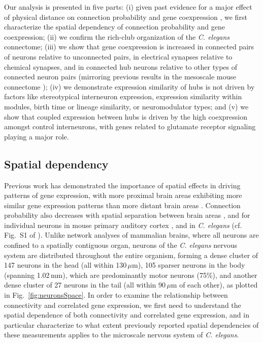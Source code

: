 \documentclass[10pt,letterpaper]{article}
\begin{document}
Our analysis is presented in five parts:
(i) given past evidence for a major effect of physical distance on connection probability and gene coexpression \cite{Fulcher:2016ck}, we first characterize the spatial dependency of connection probability and gene coexpression;
(ii) we confirm the rich-club organization of the \emph{C. elegans} connectome;
(iii) we show that gene coexpression is increased in connected pairs of neurons relative to unconnected pairs, in electrical synapses relative to chemical synapses, and in connected hub neurons relative to other types of connected neuron pairs (mirroring previous results in the mesoscale mouse connectome \cite{Fulcher:2016ck});
(iv) we demonstrate expression similarity of hubs is not driven by factors like stereotypical interneuron expression, expression similarity within modules, birth time or lineage similarity, or neuromodulator types; and
(v) we show that coupled expression between hubs is driven by the high coexpression amongst control interneurons, with genes related to glutamate receptor signaling playing a major role.


\subsection*{Spatial dependency}
Previous work has demonstrated the importance of spatial effects in driving patterns of gene expression, with more proximal brain areas exhibiting more similar gene expression patterns than more distant brain areas \cite{Krienen:2016eq, Fulcher:2016ck, Pantazatos:2016ir, Richiardi:2017hb}.
Connection probability also decreases with spatial separation between brain areas \cite{Horvat:2016ia, Wang:2016gg, Markov:2013jo, Henderson:2014fg, Fulcher:2016ck, Noori:2017ce}, and for individual neurons in mouse primary auditory cortex \cite{Levy:2012dy}, and in \emph{C. elegans} (cf. Fig.~S1 of \cite{Azulay:2016cg}).
Unlike network analyses of mammalian brains, where all neurons are confined to a spatially contiguous organ, neurons of the \emph{C. elegans} nervous system are distributed throughout the entire organism, forming a dense cluster of 147 neurons in the head (all within 130\,$\mu$m), 105 sparser neurons in the body (spanning 1.02\,mm), which are predominantly motor neurons (75\%), and another dense cluster of 27 neurons in the tail (all within 90\,$\mu$m of each other), as plotted in Fig.~\ref{fig:neuronsSpace}.
In order to examine the relationship between connectivity and correlated gene expression, we first need to understand the spatial dependence of both connectivity and correlated gene expression, and in particular characterize to what extent previously reported spatial dependencies of these measurements applies to the microscale nervous system of \emph{C. elegans}.
\end{document}
